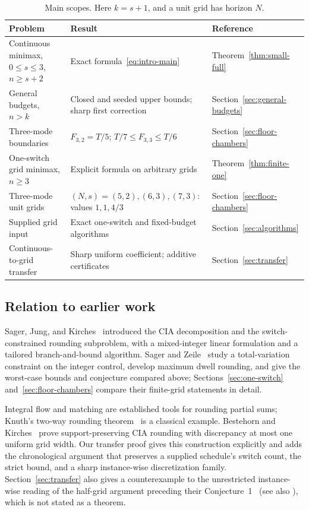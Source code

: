 \begin{table}[tb]
\centering\small
\caption{Main scopes. Here $k=s+1$, and a unit grid has horizon $N$.}
\label{tab:results-synopsis}
\begin{tabular}{@{}p{.32\linewidth}p{.43\linewidth}p{.18\linewidth}@{}}
\toprule
Problem & Result & Reference\\
\midrule
Continuous minimax, $0\le s\le3$, $n\ge s+2$
 & Exact formula~\eqref{eq:intro-main} & Theorem~\ref{thm:small-full}\\
General budgets, $n>k$ & Closed and seeded upper bounds; sharp first correction
 & Section~\ref{sec:general-budgets}\\
Three-mode boundaries & $F_{3,2}=T/5$; $T/7\le F_{3,3}\le T/6$
 & Section~\ref{sec:floor-chambers}\\
One-switch grid minimax, $n\ge3$ & Explicit formula on arbitrary grids
 & Theorem~\ref{thm:finite-one}\\
Three-mode unit grids & $(N,s)=(5,2),(6,3),(7,3)$: values $1,1,4/3$
 & Section~\ref{sec:floor-chambers}\\
Supplied grid input & Exact one-switch and fixed-budget algorithms
 & Section~\ref{sec:algorithms}\\
Continuous-to-grid transfer & Sharp uniform coefficient; additive certificates
 & Section~\ref{sec:transfer}\\
\bottomrule
\end{tabular}
\end{table}

\subsection{Relation to earlier work}

Sager, Jung, and Kirches~\cite{sager2011cia} introduced the CIA decomposition
and the switch-constrained rounding subproblem, with a mixed-integer linear
formulation and a tailored branch-and-bound algorithm. Sager and
Zeile~\cite{sager-zeile2021} study a total-variation constraint on the
integer control, develop maximum dwell rounding, and give the worst-case
bounds and conjecture compared above; Sections~\ref{sec:one-switch}
and~\ref{sec:floor-chambers} compare their finite-grid statements in
detail.

Integral flow and matching are established tools for rounding partial sums;
Knuth's two-way rounding theorem~\cite{knuth1995} is a classical example.
Bestehorn and Kirches~\cite[Corollary~2.7]{bestehorn2021vanishing} prove
support-preserving CIA rounding with discrepancy at most one uniform grid
width. Our transfer proof gives this construction explicitly and adds the
chronological argument that preserves a supplied schedule's switch count,
the strict bound, and a sharp instance-wise discretization family.
Section~\ref{sec:transfer} also gives a counterexample to the unrestricted
instance-wise reading of the half-grid argument preceding their
Conjecture~1~\cite[p.~615]{sager-zeile2021} (see also
\cite[p.~139]{zeile2021thesis}), which is not stated as a theorem.

